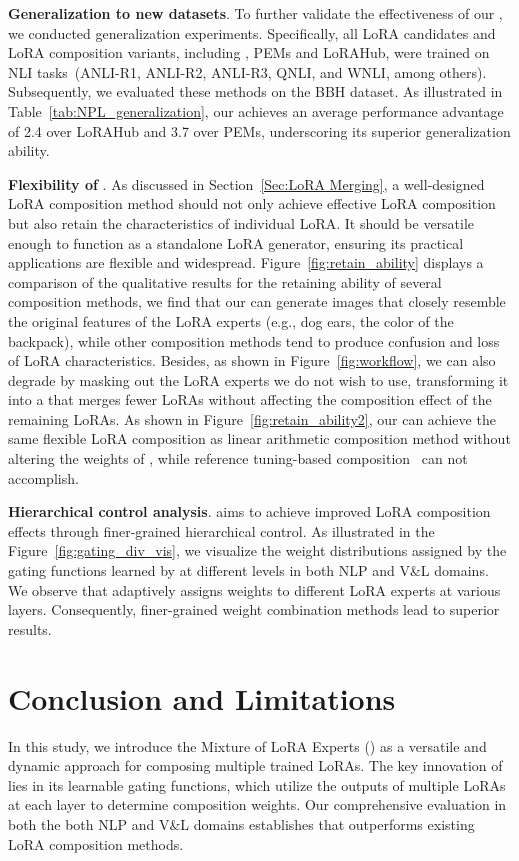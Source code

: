 \noindent\textbf{Generalization to new datasets}. To further validate the effectiveness of our \our, we conducted generalization experiments. Specifically, all LoRA candidates and LoRA composition variants, including \our, PEMs and LoRAHub, were trained on NLI tasks~(ANLI-R1, ANLI-R2, ANLI-R3, QNLI, and WNLI, among others). Subsequently, we evaluated these methods on the BBH dataset.
As illustrated in Table~\ref{tab:NPL_generalization}, our \our{} achieves an average performance advantage of 2.4 over LoRAHub and 3.7 over PEMs, underscoring its superior generalization ability.

\noindent\textbf{Flexibility of \our}. As discussed in Section~\ref{Sec:LoRA Merging}, a well-designed LoRA composition method should not only achieve effective LoRA composition but also retain the characteristics of individual LoRA. It should be versatile enough to function as a standalone LoRA generator, ensuring its practical applications are flexible and widespread.
Figure~\ref{fig:retain_ability} displays a comparison of the qualitative results for the retaining ability of several composition methods, we find that our \our{} can generate images that closely resemble the original features of the LoRA experts (e.g., dog ears, the color of the backpack), while other composition methods tend to produce confusion and loss of LoRA characteristics.
Besides, as shown in Figure~\ref{fig:workflow}, we can also degrade \our{} by masking out the LoRA experts we do not wish to use, transforming it into a \our{} that merges fewer LoRAs without affecting the composition effect of the remaining LoRAs. As shown in Figure~\ref{fig:retain_ability2}, our \our{} can achieve the same flexible LoRA composition as linear arithmetic composition method without altering the weights of \our{}, while reference tuning-based composition~\citep{gu2023mix} can not accomplish.

\noindent\textbf{Hierarchical control analysis}. \our{} aims to achieve improved LoRA composition effects through finer-grained hierarchical control. As illustrated in the Figure~\ref{fig:gating_div_vis}, we visualize the weight distributions assigned by the gating functions learned by \our{} at different levels in both NLP and V\&L domains. 
We observe that \our{} adaptively assigns weights to different LoRA experts at various layers. Consequently, finer-grained weight combination methods lead to superior results.

\vspace{-1mm}

\section{Conclusion and Limitations}
\vspace{-2mm}
In this study, we introduce the Mixture of LoRA Experts (\our) as a versatile and dynamic approach for composing multiple trained LoRAs. The key innovation of \our{} lies in its learnable gating functions, which utilize the outputs of multiple LoRAs at each layer to determine composition weights. Our comprehensive evaluation in both the both NLP and V\&L domains establishes that \our{} outperforms existing LoRA composition methods.

